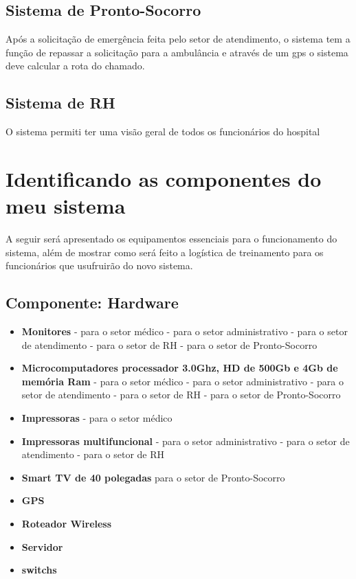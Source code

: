         \subsection{Sistema de Pronto-Socorro}
Após a solicitação de emergência feita pelo setor de atendimento, o sistema tem a função de repassar a solicitação para a ambulância e através de um gps o sistema deve calcular a rota do chamado.
        \subsection{Sistema de RH}
O sistema permiti ter uma visão geral de todos os funcionários do hospital
 \section{Identificando as componentes do meu sistema}
A seguir será apresentado os equipamentos essenciais para o funcionamento do sistema, além de mostrar como será feito a logística de treinamento para os funcionários que usufruirão do novo sistema.
     \subsection{Componente: Hardware}

\begin{itemize}
\item \textbf{Monitores}
  \subitem -  para o setor médico
  \subitem - para o setor administrativo
  \subitem -  para o setor de atendimento
  \subitem -  para o setor de RH
  \subitem -  para o setor de Pronto-Socorro
  \item \textbf{ Microcomputadores processador 3.0Ghz, HD de 500Gb e 4Gb de memória Ram}
  \subitem -  para o setor médico
  \subitem -  para o setor administrativo
  \subitem -  para o setor de atendimento
  \subitem -  para o setor de RH
  \subitem -  para o setor de Pronto-Socorro
  \item  \textbf{Impressoras}
   \subitem - para o setor médico
    \item  \textbf{Impressoras multifuncional}
  \subitem -  para o setor administrativo
  \subitem -  para o setor de atendimento
  \subitem -  para o setor de RH
  \item  \textbf{Smart TV de 40 polegadas}
    \subitem para o setor de Pronto-Socorro
  \item  \textbf{GPS}
  \item \textbf{ Roteador Wireless}
  \item  \textbf{Servidor}
  \item  \textbf{switchs}

\end{itemize}



